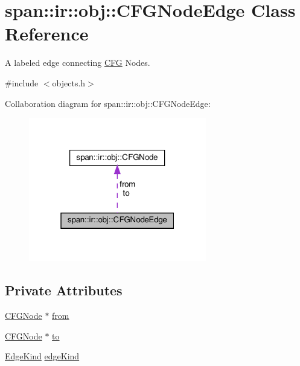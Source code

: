 \hypertarget{classspan_1_1ir_1_1obj_1_1CFGNodeEdge}{}\section{span\+:\+:ir\+:\+:obj\+:\+:C\+F\+G\+Node\+Edge Class Reference}
\label{classspan_1_1ir_1_1obj_1_1CFGNodeEdge}


A labeled edge connecting \hyperlink{classspan_1_1ir_1_1obj_1_1CFG}{C\+FG} Nodes.  




{\ttfamily \#include $<$objects.\+h$>$}



Collaboration diagram for span\+:\+:ir\+:\+:obj\+:\+:C\+F\+G\+Node\+Edge\+:\nopagebreak
\begin{figure}[H]
\begin{center}
\leavevmode
\includegraphics[width=220pt]{classspan_1_1ir_1_1obj_1_1CFGNodeEdge__coll__graph}
\end{center}
\end{figure}
\subsection*{Private Attributes}
\begin{DoxyCompactItemize}
\item 
\hyperlink{classspan_1_1ir_1_1obj_1_1CFGNode}{C\+F\+G\+Node} $\ast$ \hyperlink{classspan_1_1ir_1_1obj_1_1CFGNodeEdge_a1073fbe480fa96cba7f0aada4edd5c86}{from}
\item 
\hyperlink{classspan_1_1ir_1_1obj_1_1CFGNode}{C\+F\+G\+Node} $\ast$ \hyperlink{classspan_1_1ir_1_1obj_1_1CFGNodeEdge_a4ab4504dcafd1b370e7cc471ecc734db}{to}
\item 
\hyperlink{namespacespan_1_1ir_1_1obj_a3687553dc31f18fb1bd62e0798a3f7f0}{Edge\+Kind} \hyperlink{classspan_1_1ir_1_1obj_1_1CFGNodeEdge_a92bdcf866da2ef6d9836840f2e69a202}{edge\+Kind}
\end{DoxyCompactItemize}


